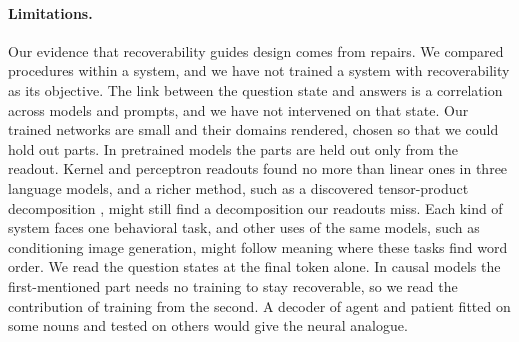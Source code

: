 \paragraph{Limitations.} Our evidence that recoverability guides design comes from repairs. We compared procedures within a system, and we have not trained a system with recoverability as its objective. The link between the question state and answers is a correlation across models and prompts, and we have not intervened on that state. Our trained networks are small and their domains rendered, chosen so that we could hold out parts. In pretrained models the parts are held out only from the readout. Kernel and perceptron readouts found no more than linear ones in three language models, and a richer method, such as a discovered tensor-product decomposition \citep{soulos2020}, might still find a decomposition our readouts miss. Each kind of system faces one behavioral task, and other uses of the same models, such as conditioning image generation, might follow meaning where these tasks find word order. We read the question states at the final token alone. In causal models the first-mentioned part needs no training to stay recoverable, so we read the contribution of training from the second. A decoder of agent and patient \citep{frankland2015} fitted on some nouns and tested on others would give the neural analogue.

